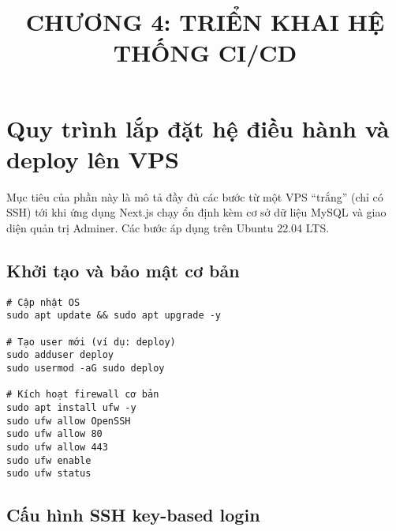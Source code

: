 \documentclass[12pt,a4paper]{article}
\title{\textbf{CHƯƠNG 4: TRIỂN KHAI HỆ THỐNG CI/CD}}
\author{}
\date{}
\begin{document}
\maketitle

\section{Quy trình lắp đặt hệ điều hành và deploy lên VPS}

Mục tiêu của phần này là mô tả đầy đủ các bước từ một VPS ``trắng'' (chỉ có SSH) tới khi ứng dụng Next.js chạy ổn định kèm cơ sở dữ liệu MySQL và giao diện quản trị Adminer. Các bước áp dụng trên Ubuntu 22.04 LTS.

\subsection{Khởi tạo và bảo mật cơ bản}

\begin{lstlisting}[caption=Cập nhật hệ thống và tạo user quản trị]
# Cập nhật OS
sudo apt update && sudo apt upgrade -y

# Tạo user mới (ví dụ: deploy)
sudo adduser deploy
sudo usermod -aG sudo deploy

# Kích hoạt firewall cơ bản
sudo apt install ufw -y
sudo ufw allow OpenSSH
sudo ufw allow 80
sudo ufw allow 443
sudo ufw enable
sudo ufw status
\end{lstlisting}

\subsection{Cấu hình SSH key-based login}
\end{document}
